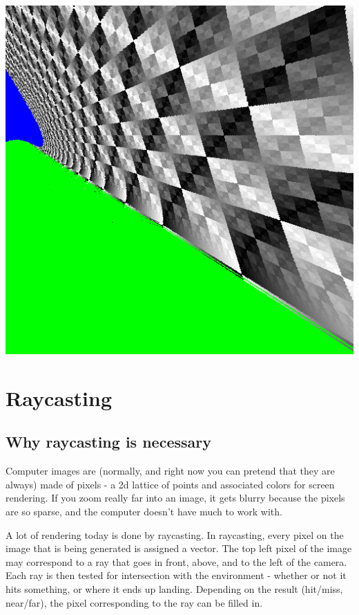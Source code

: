 

\usepackage[backend=biber]{biblatex}




\includegraphics[width=\columnwidth]{sqrt.png}

\section*{Raycasting}

\subsection*{Why raycasting is necessary}

Computer images are (normally, and right now you can pretend that they are always) made of pixels - a 2d lattice of points and associated colors for screen rendering.  If you zoom really far into an image, it gets blurry because the pixels are so sparse, and the computer doesn't have much to work with.

A lot of rendering today is done by raycasting.  In raycasting, every pixel on the image that is being generated is assigned a vector.  The top left pixel of the image may correspond to a ray that goes in front, above, and to the left of the camera.  Each ray is then tested for intersection with the environment - whether or not it hits something, or where it ends up landing.  Depending on the result (hit/miss, near/far), the pixel corresponding to the ray can be filled in.

